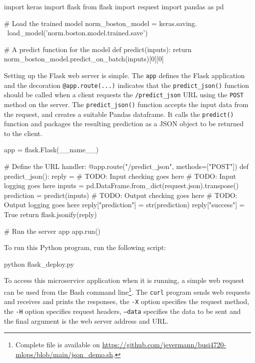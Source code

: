 \begin{pythoncode}
import keras
import flask
from flask import request
import pandas as pd

# Load the trained model
norm_boston_model = keras.saving. \
    load_model('norm.boston.model.trained.save')

# A predict function for the model
def predict(inputs):
    return norm_boston_model.predict_on_batch(inputs)[0][0]
\end{pythoncode}

Setting up the Flask web server is simple. The \texttt{app} defines the Flask application and the decoration \texttt{@app.route(...)} indicates that the \texttt{predict\_json()} function should be called when a client requests the \texttt{/predict\_json} URL using the \texttt{POST} method on the server. The \texttt{predict\_json()} function accepts the input data from the request, and creates a suitable Pandas dataframe. It calls the \texttt{predict()} function and packages the resulting prediction as a JSON object to be returned to the client. 

\begin{pythoncode}
app = flask.Flask(__name__)

# Define the URL handler:
@app.route("/predict_json", methods=["POST"])
def predict_json():
    reply = {}
    # TODO: Input checking goes here
    # TODO: Input logging goes here
    inputs = pd.DataFrame.from_dict(request.json).transpose()
    prediction = predict(inputs)
    # TODO: Output checking goes here
    # TODO: Output logging goes here
    reply["prediction"] = str(prediction)
    reply["success"] = True
    return flask.jsonify(reply)

# Run the server app
app.run()
\end{pythoncode}

To run this Python program, run the following script:

\begin{bashcode}
python flask_deploy.py
\end{bashcode}


To access this microservice application when it is running, a simple web request can be used from the Bash command line\footnote{Complete file is available on \url{https://github.com/jevermann/busi4720-mlops/blob/main/json_demo.sh}.}. The \texttt{curl} program sends web requests and receives and prints the responses, the \texttt{-X} option specifies the request method, the \texttt{-H} option specifies request headers, \texttt{--data} specifies the data to be sent and the final argument is the web server address and URL. 


